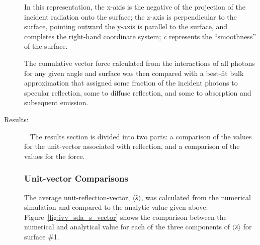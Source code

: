 \begin{description}
 			In this representation, the x-axis is the negative of the projection
			of the incident radiation onto the surface;
			the z-axis is perpendicular to the surface, pointing outward
			the y-axis is parallel to the surface, and completes the right-hand
			coordinate system; \textit{c} represents the ``smoothness'' of the surface.

      The cumulative vector force calculated from the
      interactions of all photons for any given angle and surface was
      then compared with a best-fit bulk approximation that assigned some
      fraction of the incident photons to specular reflection, some to
      diffuse reflection, and some to absorption and subsequent
      emission.
    \clearpage

    \item[Results:]\ \newline
     The results section is divided into two parts: a comparison of the
     values for the unit-vector associated with reflection, and a
     comparison of the values for the force.

     \subsubsection{Unit-vector Comparisons}


      The average unit-reflection-vector, $\langle \hat{s}\rangle$, was
      calculated from the numerical simulation and compared to the analytic
      value given above.  Figure~\ref{fig:ivv_sda_s_vector} shows the comparison
      between the numerical and analytical value for each of the three
      components of $\langle \hat{s}\rangle$ for surface \#1.


\end{description}
